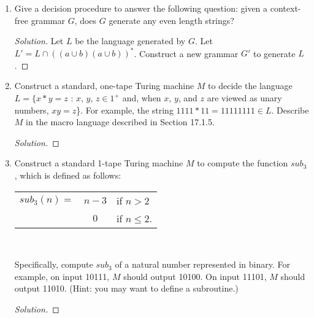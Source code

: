 \documentclass[10pt]{article}
\begin{document}
\begin{enumerate}[1)]

\item
Give a decision procedure to answer the following question: given a context-free grammar $G$, does $G$ generate any even length strings?
\begin{proof}[Solution]
Let $L$ be the language generated by $G$.  Let $L' = L \cap ((a \cup b)(a \cup b))^*$.  Construct a new grammar $G'$ to generate $L$.  
\end{proof}


\item
Construct a standard, one-tape Turing machine $M$ to decide the language $L = \{x * y = z$ : $x$, $y$, $z \in 1^+$ and, when  $x$,  $y$, and  $z$ are viewed as unary numbers,  $xy =  z$\}.  For example, the string  $1111*11=11111111 \in L$.  Describe $M$ in the macro language described in Section 17.1.5.
\begin{proof}[Solution]
\end{proof}



\item
Construct a standard 1-tape Turing machine $M$ to compute the function $sub_3$, which is defined as follows:
\begin{center}
\begin{tabular}{l c l}
$sub_3(n) =$&$n-3$ &if $n > 2$\\
&$0$&if $n \leq 2$.\\
\end{tabular}\\
\end{center}
Specifically, compute  $sub_3$ of a natural number represented in binary.  For example, on input 10111, $M$ should output 10100.  On input 11101, $M$ should output 11010.  (Hint: you may want to define a subroutine.)
\begin{proof}[Solution]
\end{proof}
\end{enumerate}
\end{document}
